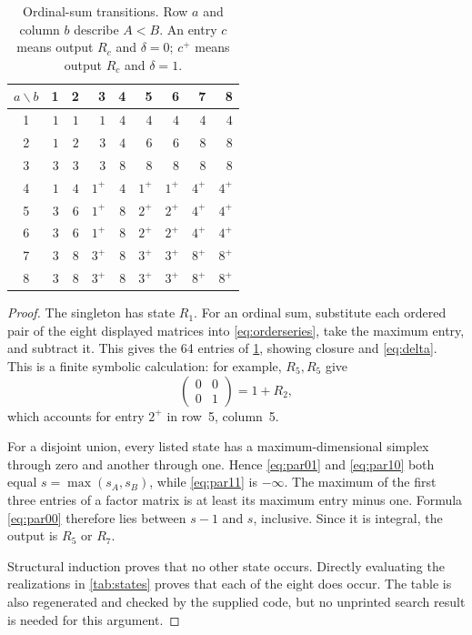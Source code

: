 \documentclass[11pt]{article}
\theoremstyle{definition}
\begin{document}
\begin{table}[htbp]
\centering
\caption{Ordinal-sum transitions. Row $a$ and column $b$ describe $A<B$. An entry $c$ means output $R_c$ and $\delta=0$; $c^{+}$ means output $R_c$ and $\delta=1$.}\label{tab:transitions}
\renewcommand{\arraystretch}{1.2}
\begin{tabular}{c|rrrrrrrr}
\toprule
$a\backslash b$ & 1&2&3&4&5&6&7&8\\
\midrule
1 & $1$ & $1$ & $1$ & $4$ & $4$ & $4$ & $4$ & $4$\\
2 & $1$ & $2$ & $3$ & $4$ & $6$ & $6$ & $8$ & $8$\\
3 & $3$ & $3$ & $3$ & $8$ & $8$ & $8$ & $8$ & $8$\\
4 & $1$ & $4$ & $1^{+}$ & $4$ & $1^{+}$ & $1^{+}$ & $4^{+}$ & $4^{+}$\\
5 & $3$ & $6$ & $1^{+}$ & $8$ & $2^{+}$ & $2^{+}$ & $4^{+}$ & $4^{+}$\\
6 & $3$ & $6$ & $1^{+}$ & $8$ & $2^{+}$ & $2^{+}$ & $4^{+}$ & $4^{+}$\\
7 & $3$ & $8$ & $3^{+}$ & $8$ & $3^{+}$ & $3^{+}$ & $8^{+}$ & $8^{+}$\\
8 & $3$ & $8$ & $3^{+}$ & $8$ & $3^{+}$ & $3^{+}$ & $8^{+}$ & $8^{+}$\\
\bottomrule
\end{tabular}
\end{table}

\begin{proof}
The singleton has state $R_1$. For an ordinal sum, substitute each ordered pair of the eight displayed matrices into \eqref{eq:orderseries}, take the maximum entry, and subtract it. This gives the 64 entries of \cref{tab:transitions}, showing closure and \eqref{eq:delta}. This is a finite symbolic calculation: for example, $R_5,R_5$ give
\[
\begin{pmatrix}0&0\\0&1\end{pmatrix}=1+R_2,
\]
which accounts for entry $2^{+}$ in row~5, column~5.

For a disjoint union, every listed state has a maximum-dimensional simplex through zero and another through one. Hence \eqref{eq:par01} and \eqref{eq:par10} both equal $s=\max(s_A,s_B)$, while \eqref{eq:par11} is $-\infty$. The maximum of the first three entries of a factor matrix is at least its maximum entry minus one. Formula \eqref{eq:par00} therefore lies between $s-1$ and $s$, inclusive. Since it is integral, the output is $R_5$ or $R_7$.

Structural induction proves that no other state occurs. Directly evaluating the realizations in \cref{tab:states} proves that each of the eight does occur. The table is also regenerated and checked by the supplied code, but no unprinted search result is needed for this argument.
\end{proof}
\end{document}
